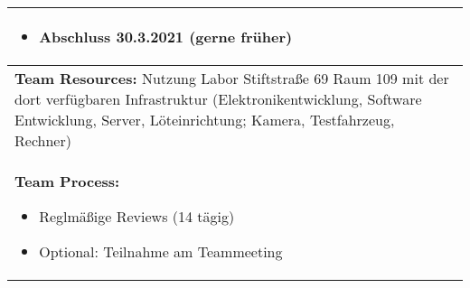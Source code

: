 \begin{tabular}{|p{15cm}|}
\begin{itemize}
\item Abschluss 30.3.2021 (gerne früher)
\end{itemize}\\
\hline
\textbf{Team Resources:}
\newline
Nutzung Labor Stiftstraße 69 Raum 109 mit der dort verfügbaren Infrastruktur (Elektronikentwicklung, Software Entwicklung, Server, Löteinrichtung; Kamera, Testfahrzeug, Rechner)\\
\hline
\textbf{Team Process:}
\begin{itemize}
\item Reglmäßige Reviews (14 tägig)
\item Optional: Teilnahme am Teammeeting
\end{itemize}\\
\hline
\end{tabular}

\newpage